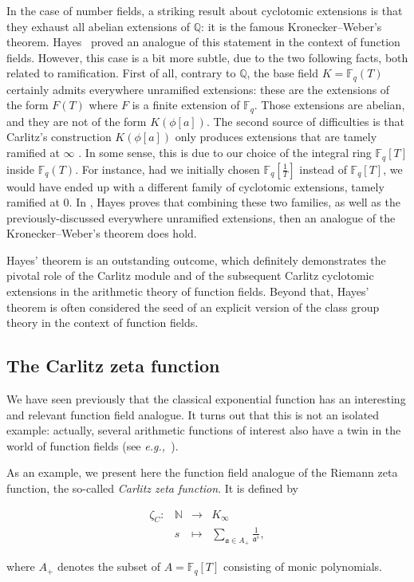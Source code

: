 \documentclass[11pt]{article}
\theoremstyle{definition}
\newcommand{\EqFunction}[6]{
  \begin{equation}
    \label{#6}
    \begin{array}{rrcl}
    #1: & #2 & \to     & #3 \\
        & #4 & \mapsto & #5
    \end{array}
  \end{equation}
}
\newcommand\N{\mathbb{N}}
\newcommand\Q{\mathbb{Q}}
\newcommand\Fq{\mathbb{F}_q}
\newcommand{\Kinf}{K_{\infty}}
\renewcommand{\a}{\mathfrak{a}}
\newcommand{\eg}{\textit{e.g.,~}}
\begin{document}
In the case of number fields, a striking result about 
cyclotomic extensions is that they exhaust all abelian extensions 
of $\Q$: it is the famous Kronecker--Weber's theorem. 
Hayes~\cite{Hayes_1974} proved an analogue of this statement in the
context of function fields.
However, this case is a bit more subtle, due to the two following facts, both related to ramification.
First of all, contrary to $\Q$, the base field $K = \Fq(T)$ certainly
admits everywhere unramified extensions: these are the extensions
of the form $F(T)$ where $F$ is a finite extension of $\Fq$.
Those extensions are abelian, and they are not of the form
$K(\phi[a])$.
The second source of difficulties is that Carlitz's construction  $K(\phi[a])$ 
only produces extensions that are tamely ramified at $\infty$ \cite[Theorem 3.1]{Hayes_1974}. In some
sense, this is due to our choice of the integral ring $\Fq[T]$ inside
$\Fq(T)$. For instance, had we initially chosen $\Fq[\frac 1 T]$ instead of $\Fq[T]$, we would have ended up with a different
family of cyclotomic extensions, tamely ramified at $0$. 
In \cite{Hayes_1974}, Hayes proves that combining these two families, as well
as the previously-discussed everywhere unramified extensions, then an analogue of the Kronecker--Weber's theorem does hold.

Hayes' theorem is an outstanding outcome, which definitely demonstrates the pivotal role of the Carlitz module and of the subsequent Carlitz cyclotomic extensions in the arithmetic theory of function fields. Beyond that, Hayes' theorem is often considered the seed of an explicit version of the class group
theory in the context of function fields.

\subsection{The Carlitz zeta function}
We have seen previously that the classical exponential function has an interesting and relevant function field analogue. It turns
out that this is not an isolated example: actually, several arithmetic functions of interest also have a twin in the world of function fields (see \eg\cite[\S~5.4]{Pap23}).

As an example, we present here the function field analogue of the Riemann zeta function, the so-called \emph{Carlitz zeta function}.
It is defined by
\EqFunction
  {\zeta_C}
  {\N}
  {\Kinf}
  {s}
  {\displaystyle \sum_{\a \in A_+} \frac 1{\a^s},}
  {eq:zetaC}
where $A_+$ denotes the subset of $A = \Fq[T]$ consisting of monic
polynomials.
\end{document}
